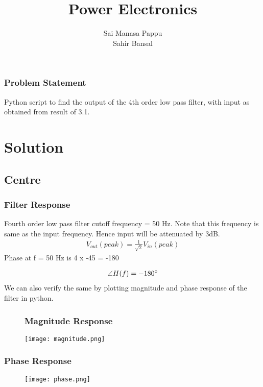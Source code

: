 \documentclass{beamer}
\title{Power Electronics}
\author{Sai Manasa Pappu \\ Sahir Bansal }
\date{}
\theoremstyle{remark}
\let\vec\mathbf
\numberwithin{equation}{section}
\begin{document}
\begin{frame}
\titlepage
\end{frame}


\begin{frame}
\frametitle{Problem Statement}
Python script to find the output of the 4th order low pass filter, with input as obtained from result of 3.1. 
\bigbreak
\end{frame}

\section{Solution}
\subsection{Centre}
\begin{frame}
\frametitle{Filter Response}
\bigbreak
\bigbreak
\bigbreak
Fourth order low pass filter cutoff frequency = 50 Hz. Note that this frequency is same as the input frequency. 
\bigbreak
Hence input will be attenuated by 3dB. 
\begin{align}
V_{out} (peak) = \frac{1}{\sqrt{2}}V_{in} (peak) 
\end{align}
%
Phase at f = 50 Hz is 4 x -45{\degree} = -180\degree

\begin{align}
\angle H(f) = -180 \degree 
\end{align}
We can also verify the same by plotting magnitude and phase response of the filter in python.
\end{frame}


\begin{frame}
\begin{figure}
\frametitle{Magnitude Response}
\texttt{[image: magnitude.png]}
\label{magnitude.png}
\end{figure}
\end{frame}

\begin{frame}
\frametitle{Phase Response}
\begin{figure}
\centering
\texttt{[image: phase.png]}
\end{figure}
\end{frame}
\end{document}
